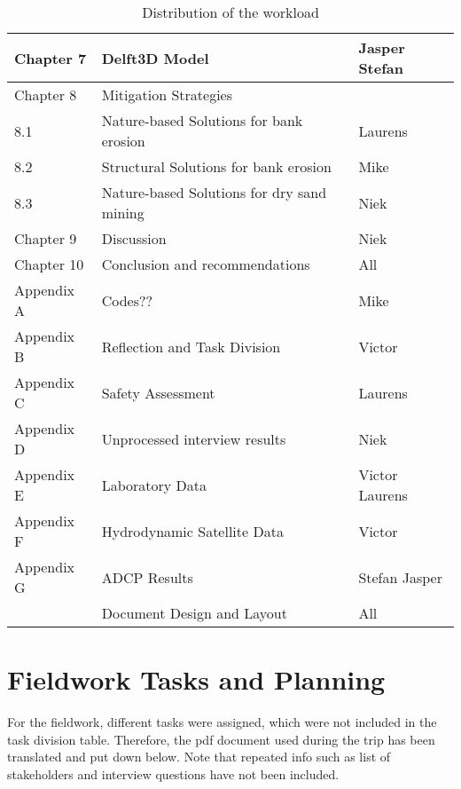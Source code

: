 \begin{table}[htb]
    \setlength\extrarowheight{4pt}
    \centering
    \caption{Distribution of the workload}
    \label{tab:taskdivision}
    \begin{tabularx}{\textwidth}{lXX}
        \toprule
                Chapter 7 & Delft3D Model & Jasper Stefan\\
        \midrule
        Chapter 8 & Mitigation Strategies & \\
        8.1 & Nature-based Solutions for bank erosion & Laurens \\
        8.2 & Structural Solutions for bank erosion & Mike \\
        8.3 & Nature-based Solutions for dry sand mining & Niek \\
        \midrule
        Chapter 9 & Discussion & Niek \\
        \midrule
        Chapter 10 & Conclusion and recommendations & All \\
        \midrule
        Appendix A & Codes?? & Mike \\
        Appendix B & Reflection and Task Division & Victor \\
        Appendix C & Safety Assessment & Laurens \\
        Appendix D & Unprocessed interview results & Niek \\
        Appendix E & Laboratory Data & Victor Laurens \\
        Appendix F & Hydrodynamic Satellite Data & Victor \\
        Appendix G & ADCP Results & Stefan Jasper\\
        \midrule
        & Document Design and Layout & All \\
        \bottomrule
    \end{tabularx}
\end{table}

\section{Fieldwork Tasks and Planning}

For the fieldwork, different tasks were assigned, which were not included in the task division table. 
Therefore, the pdf document used during the trip has been translated and put down below.
Note that repeated info such as list of stakeholders and interview questions have not been included.

